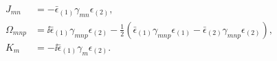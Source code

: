 \begin{equation}
\begin{aligned}
   J_{mn} &= - \bar{\epsilon}_{(1)}\gamma_{mn}\epsilon_{(2)} , \\
   \Omega_{mnp} &= 
      \ii \bar{\epsilon}_{(1)}\gamma_{mnp}\epsilon_{(2)} 
      - \tfrac{1}{2} \left(
         \bar{\epsilon}_{(1)}\gamma_{mnp}\epsilon_{(1)}
         - \bar{\epsilon}_{(2)}\gamma_{mnp}\epsilon_{(2)} 
      \right) , \\
   K_m &= - \ii \bar{\epsilon}_{(1)}\gamma_m\epsilon_{(2)} . 
\end{aligned}
\end{equation}

